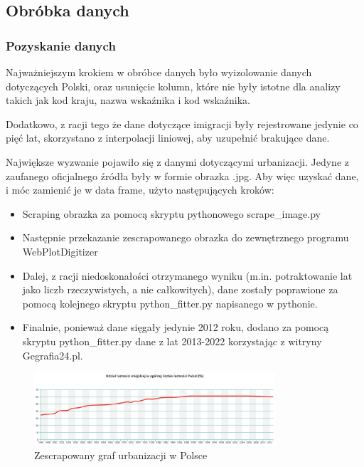 \documentclass[11pt]{article}
\begin{document}
\subsection{Obróbka danych}
\subsubsection{Pozyskanie danych}
Najważniejszym krokiem w obróbce danych było wyizolowanie danych dotyczących Polski, oraz usunięcie kolumn, które nie były istotne dla analizy takich jak kod kraju, nazwa wskaźnika i kod wskaźnika.\par
Dodatkowo, z racji tego że dane dotyczące imigracji były rejestrowane jedynie co pięć lat, skorzystano z interpolacji liniowej, aby uzupełnić brakujące dane.\par
Największe wyzwanie pojawiło się z danymi dotyczącymi urbanizacji. Jedyne z zaufanego oficjalnego źródła były w formie obrazka .jpg.
Aby więc uzyskać dane, i móc zamienić je w data frame, użyto następujących kroków:
\begin{itemize}
\item Scraping obrazka za pomocą skryptu pythonowego scrape{\_}image.py 
\item Następnie przekazanie zescrapowanego obrazka do zewnętrznego programu WebPlotDigitizer\cite{wpd}
\item Dalej, z racji niedoskonałości otrzymanego wyniku (m.in. potraktowanie lat jako liczb rzeczywistych, a nie całkowitych), dane zostały poprawione za pomocą kolejnego skryptu python{\_}fitter.py napisanego w pythonie.
\item Finalnie, ponieważ dane sięgały jedynie 2012 roku, dodano za pomocą skryptu python{\_}fitter.py dane z lat 2013-2022 korzystając z witryny Gegrafia24.pl\cite{gf24}. 
\end{itemize}
\begin{figure}[H]
        \centering
        \includegraphics[width=0.8\textwidth]{urbanizacjawPolsce.png}
        \caption{Zescrapowany graf urbanizacji w Polsce}
\end{figure}
\end{document}

